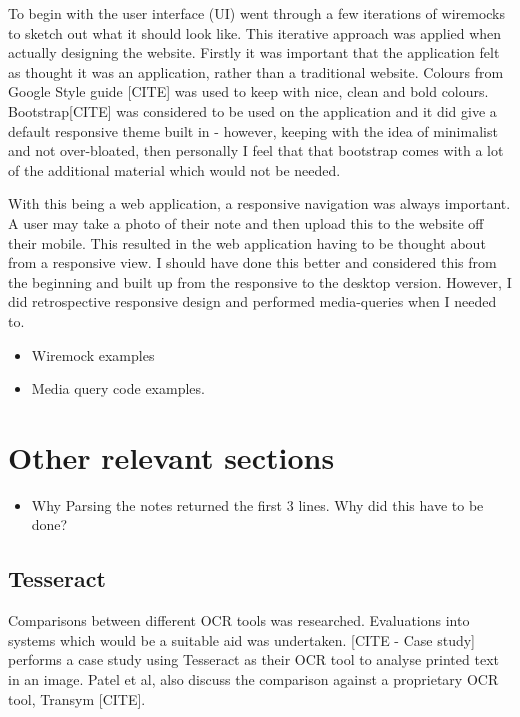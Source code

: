 To begin with the user interface (UI) went through a few iterations of wiremocks to sketch out what it should look like.  This iterative approach was applied when actually designing the website. Firstly it was important that the application felt as thought it was an application, rather than a traditional website. Colours from Google Style guide [CITE] was used to keep with nice, clean and bold colours. Bootstrap[CITE] was considered to be used on the application and it did give a default responsive theme built in - however, keeping with the idea of minimalist and not over-bloated, then personally I feel that that bootstrap comes with a lot of the additional material which would not be needed.

With this being a web application, a responsive navigation was always important. A user may take a photo of their note and then upload this to the website off their mobile. This resulted in the web application having to be thought about from a responsive view. I should have done this better and considered this from the beginning and built up from the responsive to the desktop version. However, I did retrospective responsive design and performed media-queries when I needed to.
\begin{itemize}
  \item Wiremock examples
  \item Media query code examples.
\end{itemize}
\section{Other relevant sections}

\begin{itemize}
  \item Why Parsing the notes returned the first 3 lines. Why did this have to be done?

\end{itemize}

\subsection{Tesseract}
Comparisons between different OCR tools was researched. Evaluations into systems which would be a suitable aid was undertaken. [CITE - Case study] performs a case study using Tesseract as their OCR tool to analyse printed text in an image. Patel et al, also discuss the comparison against a proprietary OCR tool, Transym [CITE].

